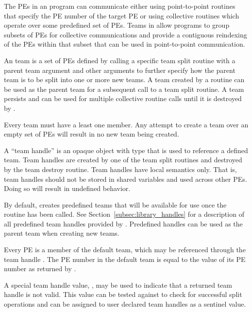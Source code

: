 The \acp{PE} in an \openshmem program can communicate either using
point-to-point routines that specify the \ac{PE} number of the target
\ac{PE} or using collective routines which operate over some predefined
set of \acp{PE}. Teams in \openshmem allow programs to group subsets
of \acp{PE} for collective communications and provide a contiguous reindexing
of the \acp{PE} within that subset that can be used in point-to-point communication.

An \openshmem team is a set of \acp{PE} defined by calling a specific team
split routine with a parent team argument and other arguments to further
specify how the parent team is to be split into one or more new teams.
A team created by a  routine can be used as the parent team
for a subsequent call to a team split routine.  A team persists and can
be used for multiple collective routine calls until it is destroyed by
.

Every team must have a least one member. Any attempt to create a team over an
empty set of \acp{PE} will result in no new team being created.

A ``team handle'' is an opaque object with type  that is used
to reference a defined team.  Team handles are created by one of the team split
routines and destroyed by the team destroy routine. Team handles have local
semantics only. That is, team handles should not be stored in shared variables
and used across other \acp{PE}. Doing so will result in undefined behavior.

By default, \openshmem creates predefined teams that will be available
for use once the routine  has been called. See
Section~\ref{subsec:library_handles} for a description of all predefined team handles
provided by \openshmem. Predefined  handles can be used as
the parent team when creating new \openshmem teams.

Every \ac{PE} is a member of the default team, which may be referenced
through the team handle .
The \ac{PE} number in the default team is equal to the
value of its \ac{PE} number as returned by .

A special team handle value, , may be used to
indicate that a returned team handle is not valid. This value can be tested
against to check for successful split operations and can be assigned to user
declared team handles as a sentinel value.

